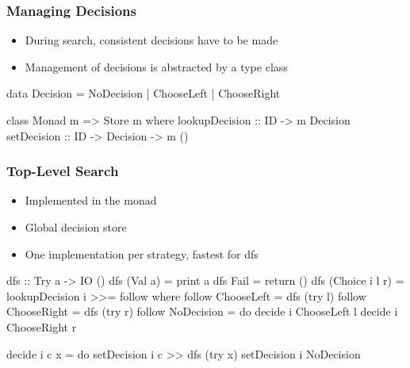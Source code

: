 \documentclass[%
,hyperref={pdfpagelabels=false}
,utf8
]{beamer}
\begin{document}
\begin{frame}[fragile]%
\frametitle{Managing Decisions}
\begin{itemize}
\item During search, consistent decisions have to be made
\item Management of decisions is abstracted by a type class
\end{itemize}

\begin{haskell}
data Decision = NoDecision
              | ChooseLeft
              | ChooseRight

class Monad m => Store m where
  lookupDecision :: ID -> m Decision
  setDecision    :: ID -> Decision -> m ()
\end{haskell}
\end{frame}

\begin{frame}[fragile]%
\frametitle{Top-Level Search}

\begin{itemize}
  \item Implemented in the  monad
  \item Global decision store
  \item One implementation per strategy, fastest for dfs
\end{itemize}

\begin{haskell}
dfs :: Try a -> IO ()
dfs (Val a)        = print a
dfs Fail           = return ()
dfs (Choice i l r) = lookupDecision i >>= follow
  where
  follow ChooseLeft  = dfs (try l)
  follow ChooseRight = dfs (try r)
  follow NoDecision  = do decide i ChooseLeft  l
                          decide i ChooseRight r

  decide i c x = do setDecision i c >> dfs (try x)
                    setDecision i NoDecision
\end{haskell}
\end{frame}
\end{document}
